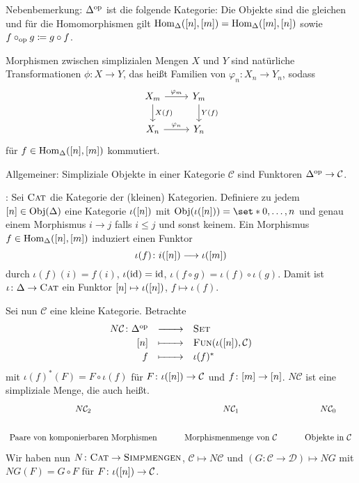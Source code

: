 Nebenbemerkung: $\Delta^\op$ ist die folgende Kategorie: Die Objekte sind die gleichen und für die Homomorphismen gilt $\Hom_\Delta(\benbrace*{n}, \benbrace*{m}) = \Hom_\Delta(\benbrace*{m}, \benbrace*{n})$ sowie $f \circ_\op g \coloneqq g \circ f$.

Morphismen zwischen simplizialen Mengen $X$ und $Y$ sind natürliche Transformationen $\phi \colon X\to Y$, das heißt Familien von $\varphi_n \colon X_n \to Y_n$, sodass 
\[
	\begin{tikzcd}
		X_m \rar["\varphi_m"] \dar["X(f)"] & Y_m \dar["Y(f)"] \\
		X_n \rar["\varphi_n"] & Y_n
	\end{tikzcd}
\]
für $f \in \Hom_\Delta(\benbrace*{n}, \benbrace*{m})$ kommutiert.

Allgemeiner: Simpliziale Objekte in einer Kategorie $\mathcal{C}$ sind Funktoren $\Delta^\op \to \mathcal{C}$.

\begin{beispiel}
	: Sei $\textsc{Cat}$ die Kategorie der (kleinen) Kategorien.
	Definiere zu jedem $\benbrace*{n} \in \Obj(\Delta)$ eine Kategorie $\iota(\benbrace*{n})$ mit $\Obj \enbrace*{\iota(\benbrace*{n})} = \set*{0, \ldots ,n}$ und genau einem Morphismus $i \to j$ falls $i \le j$ und sonst keinem.
	Ein Morphismus $f \in \Hom_\Delta(\benbrace*{n}, \benbrace*{m})$ induziert einen Funktor 
	\[
		\iota(f) \colon i \enbrace*{\benbrace*{n}} \longrightarrow \iota \enbrace*{\benbrace*{m}}
	\]
	durch $\iota(f)(i) = f(i)$, $\iota({\id}) = {\id}$, $\iota(f \circ g) = \iota(f) \circ \iota(g)$.
	Damit ist $\iota \colon \Delta \to \textsc{Cat}$ ein Funktor $\benbrace*{n} \mapsto \iota(\benbrace*{n})$, $f \mapsto \iota(f)$.
	
	Sei nun $\mathcal{C}$ eine kleine Kategorie. Betrachte 
	\[
		\begin{array}{rcl}
			\textstyle N \mathcal{C} \colon \Delta^\op &\xrightarrow{\minwidthbox{}{2em}} & \textstyle \SET \\[0.5ex]
			\textstyle \benbrace*{n} &\xmapsto{\minwidthbox{\mbox{ }}{2em}} & \textstyle \FUN \enbrace*{\iota(\benbrace*{n}), \mathcal{C}} \\[0.5ex]
			\textstyle f &\xmapsto{\minwidthbox{\mbox{ }}{2em}} & \textstyle \iota(f)^*
		\end{array}
	\]
	mit $\iota(f)^*(F) = F \circ \iota(f)$ für $F \colon \iota(\benbrace*{n}) \to \mathcal{C}$ und $f \colon \benbrace*{m} \to \benbrace*{n}$.
	$N \mathcal{C}$ ist eine simpliziale Menge, die auch  heißt.
	\[
		\begin{tikzcd}
			N \mathcal{C}_2 & N \mathcal{C}_1 & N \mathcal{C}_0 \\
			\text{Paare von komponierbaren Morphismen} & \text{Morphismenmenge von $\mathcal{C}$}  & \text{Objekte in $\mathcal{C}$} 
		\end{tikzcd}
	\]
	Wir haben nun $N \colon \textsc{Cat} \to \textsc{Simpmengen}$, $\mathcal{C} \mapsto N \mathcal{C}$ und $(G \colon \mathcal{C} \to \mathcal{D}) \mapsto N G$ mit $NG(F) = G \circ F$ für $F \colon \iota(\benbrace*{n}) \to \mathcal{C}$.
\end{beispiel}

